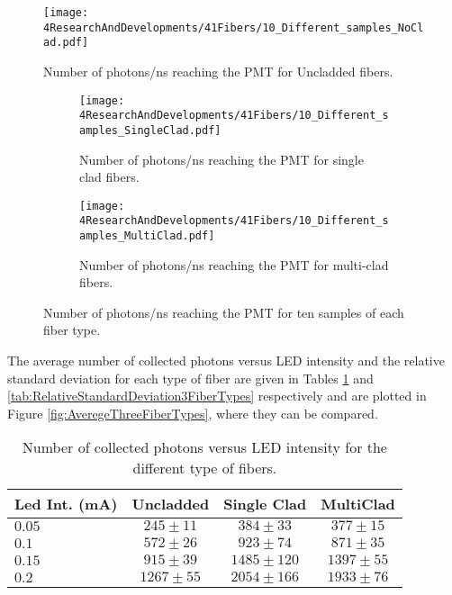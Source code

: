 \begin{figure}[h]
\centering
\texttt{[image: 4ResearchAndDevelopments/41Fibers/10\_Different\_samples\_NoClad.pdf]}
\caption{Number of photons/ns reaching the PMT for Uncladded fibers.\label{fig:10samplesNC}}
\end{figure}

\begin{figure}
\centering
    \begin{subfigure}[b]{1\textwidth}
    \centering
    \texttt{[image: 4ResearchAndDevelopments/41Fibers/10\_Different\_samples\_SingleClad.pdf]}  
    \caption{Number of photons/ns reaching the PMT for single clad fibers.\label{subfig:10samplesSC}}
    \end{subfigure}
    \hfill
    \begin{subfigure}[b]{1\textwidth}
    \centering
    \texttt{[image: 4ResearchAndDevelopments/41Fibers/10\_Different\_samples\_MultiClad.pdf]}  
    \caption{Number of photons/ns reaching the PMT for multi-clad fibers.\label{subfig:10samplesMC}}
    \end{subfigure}
 \caption{Number of photons/ns reaching the PMT for ten samples of each fiber type.}
 \label{fig:10samplesThreeTypes}
\end{figure}
The average number of collected photons versus LED intensity and the relative standard deviation for each type of fiber are given in Tables \ref{tab:10DifferentSamples} and \ref{tab:RelativeStandardDeviation3FiberTypes} respectively and are plotted in Figure \ref{fig:AveregeThreeFiberTypes}, where they can be compared. 

\begin{table}[h]
\centering{}%
\begin{tabular}{lccc}
\toprule 
Led Int. (mA) & Uncladded & Single Clad & MultiClad \tabularnewline
\midrule
\midrule 
$0.05$ & $245 \pm 11$ & $384 \pm 33$ & $377 \pm 15$ \tabularnewline
$0.1$ & $572 \pm 26$ & $923 \pm 74$ & $871 \pm 35$ \tabularnewline
$0.15$ & $915 \pm 39$ & $1485 \pm 120$ & $1397 \pm 55$ \tabularnewline
$0.2$ & $1267 \pm 55$ & $2054 \pm 166$ & $1933 \pm 76$ \tabularnewline
\bottomrule
\end{tabular}
\caption{Number of collected photons versus LED intensity for the different type of fibers.}
\label{tab:10DifferentSamples}
\end{table}


